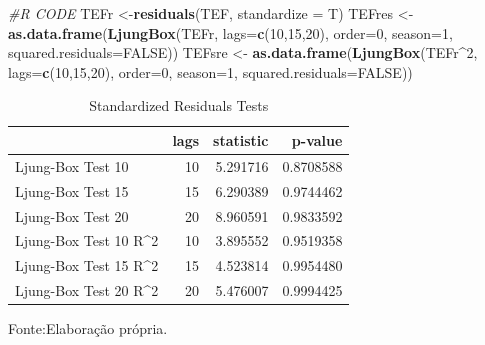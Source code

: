 \documentclass[
  12pt,
  a4paper,
  openany]{book}
\newenvironment{Shaded}{\begin{snugshade}}{\end{snugshade}}
\newcommand{\CommentTok}[1]{\textcolor[rgb]{0.56,0.35,0.01}{\textit{#1}}}
\newcommand{\DataTypeTok}[1]{\textcolor[rgb]{0.13,0.29,0.53}{#1}}
\newcommand{\DecValTok}[1]{\textcolor[rgb]{0.00,0.00,0.81}{#1}}
\newcommand{\KeywordTok}[1]{\textcolor[rgb]{0.13,0.29,0.53}{\textbf{#1}}}
\newcommand{\NormalTok}[1]{#1}
\newcommand{\OperatorTok}[1]{\textcolor[rgb]{0.81,0.36,0.00}{\textbf{#1}}}
\newcommand{\OtherTok}[1]{\textcolor[rgb]{0.56,0.35,0.01}{#1}}
\newcommand{\StringTok}[1]{\textcolor[rgb]{0.31,0.60,0.02}{#1}}
\begin{document}
\scriptsize

\begin{Shaded}
\begin{Highlighting}[]
\CommentTok{\#R CODE}
\NormalTok{TEFr \textless{}{-}}\KeywordTok{residuals}\NormalTok{(TEF, }\DataTypeTok{standardize =}\NormalTok{ T)}
\NormalTok{TEFres \textless{}{-}}\StringTok{ }\KeywordTok{as.data.frame}\NormalTok{(}\KeywordTok{LjungBox}\NormalTok{(TEFr, }\DataTypeTok{lags=}\KeywordTok{c}\NormalTok{(}\DecValTok{10}\NormalTok{,}\DecValTok{15}\NormalTok{,}\DecValTok{20}\NormalTok{), }\DataTypeTok{order=}\DecValTok{0}\NormalTok{, }\DataTypeTok{season=}\DecValTok{1}\NormalTok{, }\DataTypeTok{squared.residuals=}\OtherTok{FALSE}\NormalTok{))}
\NormalTok{TEFsre \textless{}{-}}\StringTok{ }\KeywordTok{as.data.frame}\NormalTok{(}\KeywordTok{LjungBox}\NormalTok{(TEFr}\OperatorTok{\^{}}\DecValTok{2}\NormalTok{, }\DataTypeTok{lags=}\KeywordTok{c}\NormalTok{(}\DecValTok{10}\NormalTok{,}\DecValTok{15}\NormalTok{,}\DecValTok{20}\NormalTok{), }\DataTypeTok{order=}\DecValTok{0}\NormalTok{, }\DataTypeTok{season=}\DecValTok{1}\NormalTok{, }\DataTypeTok{squared.residuals=}\OtherTok{FALSE}\NormalTok{))}
\end{Highlighting}
\end{Shaded}

\normalsize

\begin{table}[!h]

\caption{\label{tab:TEFLjunk}Standardized Residuals Tests}
\centering
\begin{tabular}[t]{lrrr}
\toprule
  & lags & statistic & p-value\\
\midrule
Ljung-Box Test 10 & 10 & 5.291716 & 0.8708588\\
Ljung-Box Test 15 & 15 & 6.290389 & 0.9744462\\
Ljung-Box Test 20 & 20 & 8.960591 & 0.9833592\\
Ljung-Box Test 10 R\textasciicircum{}2 & 10 & 3.895552 & 0.9519358\\
Ljung-Box Test 15 R\textasciicircum{}2 & 15 & 4.523814 & 0.9954480\\
\addlinespace
Ljung-Box Test 20 R\textasciicircum{}2 & 20 & 5.476007 & 0.9994425\\
\bottomrule
\end{tabular}
\end{table}
\FloatBarrier
\centering

Fonte:Elaboração própria.

\justifying
\bigskip
\end{document}
